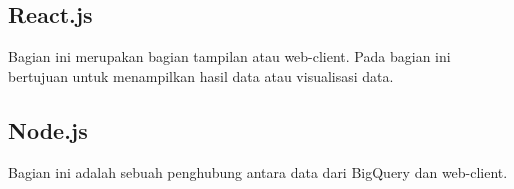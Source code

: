 \subsection{React.js}
Bagian ini merupakan bagian tampilan atau web-client. Pada bagian ini bertujuan untuk menampilkan hasil data atau visualisasi data.

\subsection{Node.js}
Bagian ini adalah sebuah penghubung antara data dari BigQuery dan web-client.





%
%
%
%
%
%
